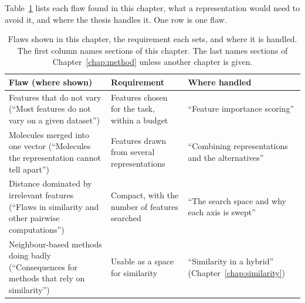 Table~\ref{tab:flaws:requirements} lists each flaw found in this chapter, what a representation would need to avoid it, and where the thesis handles it. One row is one flaw.

\begin{table}[htbp]
\centering
\small
\caption{Flaws shown in this chapter, the requirement each sets, and where it is handled. The first column names sections of this chapter. The last names sections of Chapter~\ref{chap:method} unless another chapter is given.}
\label{tab:flaws:requirements}
\begin{tabular}{p{}p{}p{}}
\toprule
Flaw (where shown) & Requirement & Where handled \\
\midrule
Features that do not vary (``Most features do not vary on a given dataset'') & Features chosen for the task, within a budget & ``Feature importance scoring'' \\
Molecules merged into one vector (``Molecules the representation cannot tell apart'') & Features drawn from several representations & ``Combining representations and the alternatives'' \\
Distance dominated by irrelevant features (``Flaws in similarity and other pairwise computations'') & Compact, with the number of features searched & ``The search space and why each axis is swept'' \\
Neighbour-based methods doing badly (``Consequences for methods that rely on similarity'') & Usable as a space for similarity & ``Similarity in a hybrid'' (Chapter~\ref{chap:similarity}) \\
\bottomrule
\end{tabular}
\end{table}
